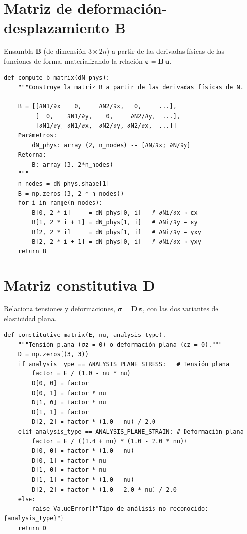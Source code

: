 \section{Matriz de deformación-desplazamiento B}

Ensambla $\bm{B}$ (de dimensión $3\times 2n$) a partir de las derivadas físicas de las funciones de forma, materializando la relación $\bm{\varepsilon} = \bm{B}\,\bm{u}$.

\begin{lstlisting}
def compute_b_matrix(dN_phys):
    """Construye la matriz B a partir de las derivadas físicas de N.

    B = [[∂N1/∂x,   0,     ∂N2/∂x,   0,     ...],
         [  0,    ∂N1/∂y,    0,     ∂N2/∂y,  ...],
         [∂N1/∂y, ∂N1/∂x,  ∂N2/∂y, ∂N2/∂x,  ...]]
    Parámetros:
        dN_phys: array (2, n_nodes) -- [∂N/∂x; ∂N/∂y]
    Retorna:
        B: array (3, 2*n_nodes)
    """
    n_nodes = dN_phys.shape[1]
    B = np.zeros((3, 2 * n_nodes))
    for i in range(n_nodes):
        B[0, 2 * i]     = dN_phys[0, i]   # ∂Ni/∂x → εx
        B[1, 2 * i + 1] = dN_phys[1, i]   # ∂Ni/∂y → εy
        B[2, 2 * i]     = dN_phys[1, i]   # ∂Ni/∂y → γxy
        B[2, 2 * i + 1] = dN_phys[0, i]   # ∂Ni/∂x → γxy
    return B
\end{lstlisting}

\section{Matriz constitutiva D}

Relaciona tensiones y deformaciones, $\bm{\sigma} = \bm{D}\,\bm{\varepsilon}$, con las dos variantes de elasticidad plana.

\begin{lstlisting}
def constitutive_matrix(E, nu, analysis_type):
    """Tensión plana (σz = 0) o deformación plana (εz = 0)."""
    D = np.zeros((3, 3))
    if analysis_type == ANALYSIS_PLANE_STRESS:   # Tensión plana
        factor = E / (1.0 - nu * nu)
        D[0, 0] = factor
        D[0, 1] = factor * nu
        D[1, 0] = factor * nu
        D[1, 1] = factor
        D[2, 2] = factor * (1.0 - nu) / 2.0
    elif analysis_type == ANALYSIS_PLANE_STRAIN: # Deformación plana
        factor = E / ((1.0 + nu) * (1.0 - 2.0 * nu))
        D[0, 0] = factor * (1.0 - nu)
        D[0, 1] = factor * nu
        D[1, 0] = factor * nu
        D[1, 1] = factor * (1.0 - nu)
        D[2, 2] = factor * (1.0 - 2.0 * nu) / 2.0
    else:
        raise ValueError(f"Tipo de análisis no reconocido: {analysis_type}")
    return D
\end{lstlisting}

